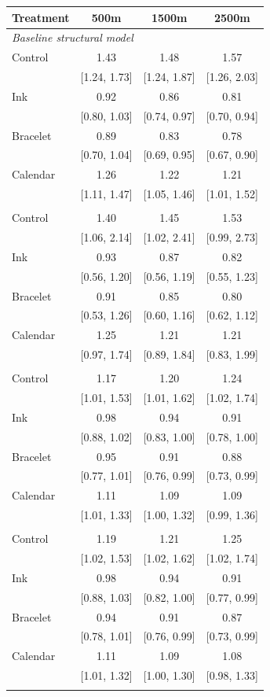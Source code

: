 \begin{tabular}{lccc}
\toprule
Treatment & 500m & 1500m & 2500m \\
\midrule
\multicolumn{4}{l}{\textit{Baseline structural model}} \\
Control & 1.43 & 1.48 & 1.57 \\
 & [1.24, 1.73] & [1.24, 1.87] & [1.26, 2.03] \\
Ink & 0.92 & 0.86 & 0.81 \\
 & [0.80, 1.03] & [0.74, 0.97] & [0.70, 0.94] \\
Bracelet & 0.89 & 0.83 & 0.78 \\
 & [0.70, 1.04] & [0.69, 0.95] & [0.67, 0.90] \\
Calendar & 1.26 & 1.22 & 1.21 \\
 & [1.11, 1.47] & [1.05, 1.46] & [1.01, 1.52] \\
\addlinespace
\multicolumn{4}{l}{\textit{Cluster weighted-likelihood bootstrap}} \\
Control & 1.40 & 1.45 & 1.53 \\
 & [1.06, 2.14] & [1.02, 2.41] & [0.99, 2.73] \\
Ink & 0.93 & 0.87 & 0.82 \\
 & [0.56, 1.20] & [0.56, 1.19] & [0.55, 1.23] \\
Bracelet & 0.91 & 0.85 & 0.80 \\
 & [0.53, 1.26] & [0.60, 1.16] & [0.62, 1.12] \\
Calendar & 1.25 & 1.21 & 1.21 \\
 & [0.97, 1.74] & [0.89, 1.84] & [0.83, 1.99] \\
\addlinespace
\multicolumn{4}{l}{\textit{Cluster random shock}} \\
Control & 1.17 & 1.20 & 1.24 \\
 & [1.01, 1.53] & [1.01, 1.62] & [1.02, 1.74] \\
Ink & 0.98 & 0.94 & 0.91 \\
 & [0.88, 1.02] & [0.83, 1.00] & [0.78, 1.00] \\
Bracelet & 0.95 & 0.91 & 0.88 \\
 & [0.77, 1.01] & [0.76, 0.99] & [0.73, 0.99] \\
Calendar & 1.11 & 1.09 & 1.09 \\
 & [1.01, 1.33] & [1.00, 1.32] & [0.99, 1.36] \\
\addlinespace
\multicolumn{4}{l}{\textit{Cluster random shock: prior SD 0.25}} \\
Control & 1.19 & 1.21 & 1.25 \\
 & [1.02, 1.53] & [1.02, 1.62] & [1.02, 1.74] \\
Ink & 0.98 & 0.94 & 0.91 \\
 & [0.88, 1.03] & [0.82, 1.00] & [0.77, 0.99] \\
Bracelet & 0.94 & 0.91 & 0.87 \\
 & [0.78, 1.01] & [0.76, 0.99] & [0.73, 0.99] \\
Calendar & 1.11 & 1.09 & 1.08 \\
 & [1.01, 1.32] & [1.00, 1.30] & [0.98, 1.33] \\
\addlinespace
\bottomrule
\end{tabular}
